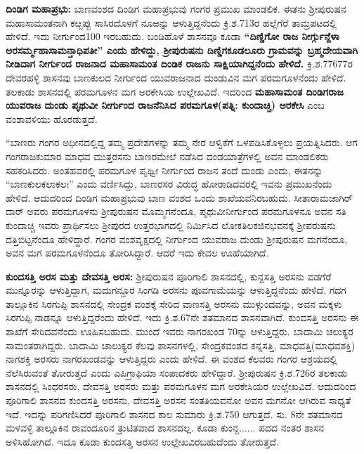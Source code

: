 \textbf{ದಿಂಡಿಗ ಮಹಾಪ್ರಭು:} ಬಾಣವಂಶದ ದಿಂಡಿಗ ಮಹಾಪ್ರಭುವು ಗಂಗರ ಪ್ರಮುಖ ಮಾಂಡಲಿಕ. ಈತನು ಶ‍್ರೀಪುರುಷನ ಮಹಾಸಾಮಂತನಾಗಿ ಕೞ್ಬಪ್ಪು ಸಾಸಿರದೊಳಗೆ ನೂಱನ್ನು ಆಳುತ್ತಿದ್ದನೆಂದು ಕ್ರಿ.ಶ.713ರ ಹಲ್ಲೆಗೆರೆ ತಾಮ್ರಪಟದಲ್ಲಿ ಹೇಳಿದೆ. ಇದು ನೀರ್ಗುಂದ100 ಇರಬಹುದು. ಬಂಡಿಹೊಳೆ ಶಾಸನವೂ ಕೂಡಾ \textbf{“ದಿಣ್ಡಿಗೋ ರಾಜ ನೀರ್ಗ್ಗುನ್ದೆಳಾ ಅರಸರ್ಮ್ಮಹಾಸಾಮನ್ತಾಧಿಪತೀ” ಎಂದು ಹೇಳಿದ್ದು, ಶ‍್ರೀಪುರುಷನು ದಿಣ್ಡಿಗಕೂಡಲೂರು ಗ್ರಾಮವನ್ನು ಬ್ರಹ್ಮದೇಯವಾಗಿ ನೀಡಿದಾಗ ನೀರ್ಗುಂದ ರಾಜನಾದ ಮಹಾಸಾಮಂತ ದಿಂಡಿಕ ರಾಜನು ಸಾಕ್ಷಿಯಾಗಿದ್ದನೆಂದು ಹೇಳಿದೆ.} ಕ್ರಿ.ಶ.776\enginline{-}77ರ ದೇವರಹಳ್ಳಿ ಶಾಸನವು ಬಾಣಕುಲದ ನೀರ್ಗುಂದ ಯುವರಾಜನಾದ ದುಂಡುವಿನ ಮಗ ಪರಮಗೂಳನೆಂದು ಹೇಳಿದೆ. ತಲಕಾಡು ಶಾಸನದಲ್ಲಿ ಪರಮಗೂಳನ ಮಗ ಅರಕೇಸಿಯ ಉಲ್ಲೇಖವಿದೆ. ಇದರಿಂದ \textbf{ಮಹಾಸಾಮಂತ ದಿಂಡಿಗರಾಜ\general{\enginline{-}} ಯುವರಾಜ ದುಂಡು\general{\enginline{-}} ಪೃಥುವೀ ನೀರ್ಗುಂದ ರಾಜನೆನಿಸಿದ ಪರಮಗೂಳ(ಪತ್ನಿ: ಕುಂದಾಚ್ಚಿ)\general{\enginline{-}} ಅರಕೇಸಿ} ಎಂಬ ವಂಶಾವಳಿಯು ಹೊರಡುತ್ತದೆ.

“ಬಾಣರು ಗಂಗರ ಅಧೀನದಲ್ಲಿದ್ದ ತಮ್ಮ ಪ್ರದೇಶಗಳನ್ನು ತಮ್ಮ ನೇರ ಆಳ್ವಿಕೆಗೆ ಒಳಪಡಿಸಿಕೊಳ್ಳಲು ಪ್ರಯತ್ನಿಸಿದರು. ಆಗ ಗಂಗರಾಜಕುಮಾರ ಮಾಧವ ಮುತ್ತರಸನು ಬಾಣರಮೇಲೆ ನಡೆಸಿದ ದಂಡಯಾತ್ರೆಗಳಲ್ಲಿ ಅವನ ಮಾಂಡಲಿಕರು ಸಹಕರಿಸಿದರು. ಅಂತಹವರಲ್ಲಿ ಪರಮಗೂಳ ಪೃಥ್ವೀ ನೀರ್ಗುಂದ ರಾಜನ ತಂದೆ ದುಂಡು ಎಂದು, ಈತನನ್ನು “ಬಾಣಕುಲ\-ಕಲಾಕಲಃ” ಎಂದು ವರ್ಣಿಸಿದ್ದು, ಬಾಣರಸರ ವಿರುದ್ಧ ಹೋರಾಡಿದವರಲ್ಲಿ ಇವನು ಪ್ರಮುಖನೆಂದು ಹೇಳಿದೆ. ಆದುದರಿಂದ ದಿಂಡಿಗ ಮಹಾಪ್ರಭುವು ಬಾಣ ವಂಶದ ಒಂದು ಶಾಖೆಯವನಿರಬಹುದು. ಸೀತಾರಾಮಜಾಗಿರ್​ದಾರ್​ ಅವರು ಪರಮಗೂಳನು ಶ‍್ರೀಪುರುಷನ ಮೊಮ್ಮಗನೆಂದೂ, ಪೃಥುವೀನೀರ್ಗುಂದ ಪರಮಗೂಳನೂ ಅವನ ಸತಿ ಕುಂದಾಚ್ಚಿ ಇವರು ಪ್ರಾರ್ಥಿಸಲು ಶ‍್ರೀಪುರದ ಉತ್ತರಭಾಗದಲ್ಲಿ ನಿರ್ಮಿಸಿದ ಲೋಕತಿಲಕಜಿನಭವನಕ್ಕೆ ಶ‍್ರೀಪರುಷನು ದತ್ತಿಬಿಟ್ಟನೆಂದೂ ಹೇಳಿದ್ದಾರೆ. ಗಂಗರ ವಂಶವೃಕ್ಷದಲ್ಲಿ ನೀರ್ಗುಂದ ಯುವರಾಜ ದುಂಡು ಶ‍್ರೀಪುರುಷನ ಮಗನೆಂದೂ, ಅವನ ಮಗ ಪರಮಗೂಳನೆಂದೂ ತೋರಿಸಿದ್ದಾರೆ. ಆದರೆ ಇದು ಕೇವಲ ಊಹೆಯಾಗಿದೆ.

\textbf{ಕುಂದಸತ್ತಿ ಅರಸ ಮತ್ತು ದೇವಸತ್ತಿ ಅರಸ:} ಶ‍್ರೀಪುರುಷನ ಪೂರಿಗಾಲಿ ಶಾಸನದಲ್ಲಿ, ಕುನ್ದಸತ್ತಿ ಅರಸನು ವಡಗೆರೆ ಮುನ್ನೂರನ್ನು ಆಳುತ್ತಿದ್ದಾಗ, ಮದುಗನ್ದೂರ ಸಿಂಗಡಿ ಅರಸನು ಪೂವಗಾಮೆಯನ್ನು ಆಳುತ್ತಿದ್ದನೆಂದು ಹೇಳಿದೆ. ಗದಗ ತಾಲ್ಲೂಕಿನ ಸಿರಗುಪ್ಪಿ ಶಾಸನದಲ್ಲಿ ಸೇಂದ್ರಕ ವಂಶಕ್ಕೆ ಸೇರಿದ ವಾಣಸತ್ತಿ ಅರಸನು ಮುಳ್ಗುಂದವನ್ನು, ಅವನ ಮಕ್ಕಳು ಸಿರಗುಪ್ಪಿ ನಾಡನ್ನೂ ಆಳುತ್ತಿದ್ದರೆಂದು ಹೇಳಿದೆ. ಇದು ಕ್ರಿ.ಶ.6\enginline{-}7ನೇ ಶತಮಾನದ ಶಾಸನವಾಗಿದೆ. ಕುಂದಸತ್ತಿ ಅರಸನು ಈ ಶಾಖೆಗೆ ಸೇರಿದವನೆಂದು ಊಹಿಸಬಹುದು. ಮುಂದೆ ಇವರು ನಾಗರಖಂಡ 70ನ್ನು ಆಳುತ್ತಿದ್ದರು. ಬಾದಾಮಿ ಚಲುಕ್ಯರ ಸಾಮಂತರಾಗಿದ್ದರು. ಬಾದಾಮಿ ಚಾಲುಕ್ಯರ ಕೆಲವು ಶಾಸನಗಳಲ್ಲಿ, ಸೇಂದ್ರಕವಂಶದ ಕನ್ನಸತ್ತಿ, ಮಾಧವತ್ತಿ(ಮಾಧವಶಕ್ತಿ) ನಾಗಶಕ್ತಿ ಅರಸರು ನಾಗರಖಂಡವನ್ನು ಆಳುತ್ತಿದ್ದರು ಎಂದು ಹೇಳಿದೆ. ಈ ವಂಶದ ಕೆಲವರು ಗಂಗರ ಆಶ್ರಯದಲ್ಲಿ ನೆಲೆಸಿರುವಂತೆ ತೋರುತ್ತದೆ ಎಂದು ಎಪಿಗ್ರಾಫಿಯಾ ಸಂಪಾದಕರು ಹೇಳಿದ್ದಾರೆ. ಶ‍್ರೀಪುರುಷನ ಕ್ರಿ.ಶ.726ರ ತಲಕಾಡು ಶಾಸನದಲ್ಲಿ ಸಿಂಧರಸರು, ದೇವಸತ್ತಿ ಅರಸರು ಮತ್ತು ಪರಮಗೂಳನ ಮಗ ಅರಕೇಸಿಯರ ಉಲ್ಲೇಖವಿದೆ. ಆದುದರಿಂದ ಪೂರಿಗಾಲಿ ಶಾಸನದ ಕುಂದಸತ್ತಿ ಅರಸನು, ದೇವಸತ್ತಿ ಅರಸನ ಸಂತತಿಯವನೋ ಅವನ ಮಗನೋ ಆಗಿರುವ ಸಾಧ್ಯತೆ ಇದೆ. ಇದನ್ನು ಪರಿಗಣಿಸಿದರೆ ಪೂರಿಗಾಲಿ ಶಾಸನದ ಕಾಲ ಸುಮಾರು ಕ್ರಿ.ಶ.750 ಆಗುತ್ತದೆ. ಸು. 8ನೇ ಶತಮಾನದ ಮಳವಳ್ಳಿ ತಾಲ್ಲೂಕಿನ ರಾವಂದೂರಿನ ತ್ರುಟಿತವಾದ ಶಾಸನ\-ದಲ್ಲ. ಕೂಡಾ ಕುಂನ್ದ...... ಪದದ ನಂತರ ಶಾಸನ ಅಳಿಸಿಹೋಗಿದೆ. ಇದೂ ಕೂಡಾ ಕುಂದಸತ್ತಿ ಅರಸನ ಉಲ್ಲೇಖವಿರಬಹುದೆಂದು ತೋರುತ್ತದೆ.


